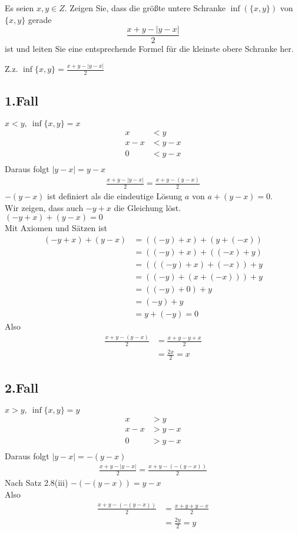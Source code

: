 \bigskip


\begin{aufg}[6 Punkte]
Es seien $x,y\in Z$. Zeigen Sie, dass die gr\"o{\ss}te untere Schranke $\inf(\{x,y\})$ von $\{x,y\}$ gerade 
\[
\frac{x+y - |y-x|}{2}
\]
ist und leiten Sie eine entsprechende Formel f\"ur die kleinste obere Schranke her.
\end{aufg}


\bigskip

\begin{lsg}
Z.z. $\inf\{x,y\}=\frac{x+y-|y-x|}{2}$ 
\subsection*{1.Fall} 
$x<y, \ \inf\{x,y\}=x$
\begin{align*}
    x&<y \\
    x-x&<y-x \\
    0&<y-x \\
\end{align*}
Daraus folgt $|y-x|=y-x$
\begin{align*}
    \frac{x+y-|y-x|}{2}=\frac{x+y-(y-x)}{2}
\end{align*}
$-(y-x)$ ist definiert als die eindeutige Lösung $a$ von $a+(y-x)=0$. \\
Wir zeigen, dass auch $-y+x$ die Gleichung löst.\\
$(-y+x)+(y-x)=0$\\
Mit Axiomen und Sätzen ist
\begin{align*}
    (-y+x)+(y-x)&=((-y)+x)+(y+(-x))\\
    &=((-y)+x)+((-x)+y)\\
    &=(((-y)+x)+(-x))+y\\
    &=((-y)+(x+(-x)))+y\\
    &=((-y)+0)+y\\
    &=(-y)+y\\
    &=y+(-y)=0
\end{align*}
Also
\begin{align*}
    \frac{x+y-(y-x)}{2}&=\frac{x+y-y+x}{2}\\
    &=\frac{2x}{2}=x
\end{align*}
\subsection*{2.Fall} 
$x>y, \ \inf\{x,y\}=y$
\begin{align*}
    x&>y \\
    x-x&>y-x \\
    0&>y-x \\
\end{align*}
Daraus folgt $|y-x|=-(y-x)$
\begin{align*}
    \frac{x+y-|y-x|}{2}=\frac{x+y-(-(y-x))}{2}
\end{align*}
Nach Satz 2.8(iii) $-(-(y-x))=y-x$\\
Also
\begin{align*}
    \frac{x+y-(-(y-x))}{2}&=\frac{x+y+y-x}{2}\\
    &=\frac{2y}{2}=y
\end{align*}

\end{lsg}
